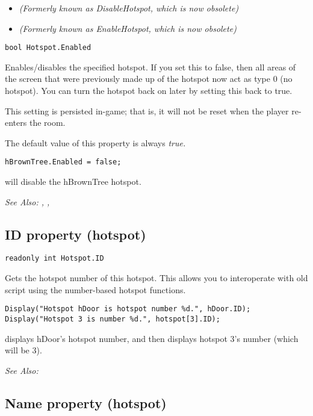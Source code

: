 \begin{itemize}
\item \it{(Formerly known as DisableHotspot, which is now obsolete)}
\item \it{(Formerly known as EnableHotspot, which is now obsolete)}
\end{itemize}

\begin{verbatim}
bool Hotspot.Enabled
\end{verbatim}
Enables/disables the specified hotspot. If you set this to false, then all areas of the screen
that were previously made up of the hotspot now act as type 0 (no hotspot). You can turn the
hotspot back on later by setting this back to true.

This setting is persisted in-game; that is, it will not be reset when the player
re-enters the room.

The default value of this property is always \it{true}.

\begin{verbatim}
hBrownTree.Enabled = false;
\end{verbatim}
will disable the hBrownTree hotspot.

\it{See Also:} ,
,


\subsection{ID property (hotspot)}\label{Hotspot.ID}%

\begin{verbatim}
readonly int Hotspot.ID
\end{verbatim}
Gets the hotspot number of this hotspot. This allows you to interoperate with old
script using the number-based hotspot functions.

\begin{verbatim}
Display("Hotspot hDoor is hotspot number %d.", hDoor.ID);
Display("Hotspot 3 is number %d.", hotspot[3].ID);
\end{verbatim}
displays hDoor's hotspot number, and then displays hotspot 3's number (which will be 3).

\it{See Also:} 


\subsection{Name property (hotspot)}\label{Hotspot.Name}%

